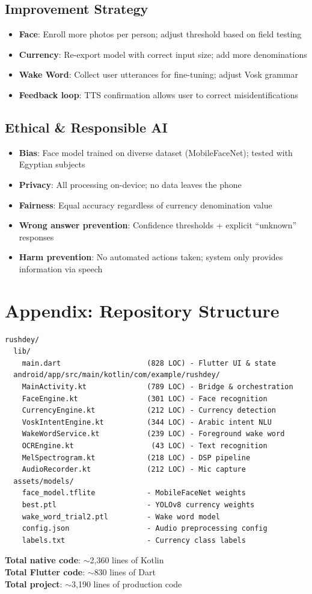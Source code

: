 \documentclass[12pt,a4paper]{article}
\begin{document}
\subsection{Improvement Strategy}
\begin{itemize}
  \item \textbf{Face}: Enroll more photos per person; adjust threshold based on field testing
  \item \textbf{Currency}: Re-export model with correct input size; add more denominations
  \item \textbf{Wake Word}: Collect user utterances for fine-tuning; adjust Vosk grammar
  \item \textbf{Feedback loop}: TTS confirmation allows user to correct misidentifications
\end{itemize}

\subsection{Ethical \& Responsible AI}
\begin{itemize}
  \item \textbf{Bias}: Face model trained on diverse dataset (MobileFaceNet); tested with Egyptian subjects
  \item \textbf{Privacy}: All processing on-device; no data leaves the phone
  \item \textbf{Fairness}: Equal accuracy regardless of currency denomination value
  \item \textbf{Wrong answer prevention}: Confidence thresholds + explicit ``unknown'' responses
  \item \textbf{Harm prevention}: No automated actions taken; system only provides information via speech
\end{itemize}

\newpage
\section*{Appendix: Repository Structure}
\begin{lstlisting}
rushdey/
  lib/
    main.dart                    (828 LOC) - Flutter UI & state
  android/app/src/main/kotlin/com/example/rushdey/
    MainActivity.kt              (789 LOC) - Bridge & orchestration
    FaceEngine.kt                (301 LOC) - Face recognition
    CurrencyEngine.kt            (212 LOC) - Currency detection
    VoskIntentEngine.kt          (344 LOC) - Arabic intent NLU
    WakeWordService.kt           (239 LOC) - Foreground wake word
    OCREngine.kt                  (43 LOC) - Text recognition
    MelSpectrogram.kt            (218 LOC) - DSP pipeline
    AudioRecorder.kt             (212 LOC) - Mic capture
  assets/models/
    face_model.tflite            - MobileFaceNet weights
    best.ptl                     - YOLOv8 currency weights
    wake_word_trial2.ptl         - Wake word model
    config.json                  - Audio preprocessing config
    labels.txt                   - Currency class labels
\end{lstlisting}

\textbf{Total native code}: $\sim$2,360 lines of Kotlin \\
\textbf{Total Flutter code}: $\sim$830 lines of Dart \\
\textbf{Total project}: $\sim$3,190 lines of production code
\end{document}
